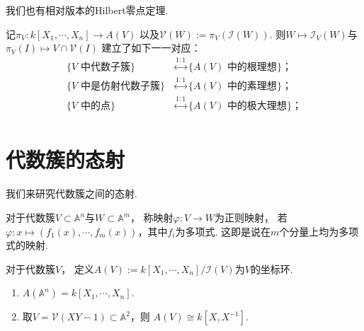     我们也有相对版本的Hilbert零点定理.

    \begin{theorem}[相对版本的Hilbert零点定理]
        记$\pi_{V}\colon k[X_{1},\cdots,X_{n}] \rightarrow A(V)$
        以及$\mathcal{V}(W):=\pi_{V}(\mathcal{I}(W))$. 
        则$W \mapsto \mathcal{I}_{V}(W)$与$\pi_{V}(I) \mapsto V \cap \mathcal{V}(I)$
        建立了如下一一对应：
        \begin{equation*}\begin{aligned}
            \{V\text{ 中代数子簇}\} 
            &\overset{1:1}{\longleftrightarrow} \{A(V)\text{ 中的根理想}\}； \\
            \{V\text{ 中是仿射代数子簇}\}
            &\overset{1:1}{\longleftrightarrow} \{A(V)\text{ 中的素理想}\}； \\
            \{V\text{ 中的点}\} 
            &\overset{1:1}{\longleftrightarrow} \{A(V)\text{ 中的极大理想}\}； \\
        \end{aligned}\end{equation*}
    \end{theorem}


\section*{代数簇的态射}
    我们来研究代数簇之间的态射.
    \begin{definition}
        对于代数簇$V \subset \mathbb{A}^{n}$与$W \subset \mathbb{A}^{m}$，
        称映射$\varphi\colon V \rightarrow W$为正则映射，
        若$\varphi\colon x \mapsto (f_{1}(x),\cdots,f_{m}(x))$，其中$f_{i}$为多项式. 
        这即是说在$m$个分量上均为多项式的映射.
    \end{definition}

    \begin{definition}
        对于代数簇$V$，
        定义$A(V):=k[X_{1},\cdots,X_{n}]/\mathcal{I}(V)$为$V$的坐标环.
    \end{definition}

    \begin{example}
        \begin{enumerate}
            \item[(1)] $A(\mathbb{A}^{n})=k[X_{1},\cdots,X_{n}]$.
            \item[(2)] 取$V=\mathcal{V}(XY-1) \subset \mathbb{A}^{2}$，则
                       $A(V) \cong k[X,X^{-1}]$.
        \end{enumerate}
    \end{example}

